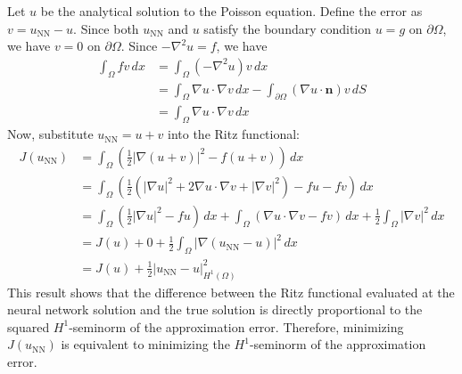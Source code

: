 \documentclass{article}
\begin{document}
Let $u$ be the analytical solution to the Poisson equation. Define the error as $v = u_{\text{NN}} - u$. Since both $u_{\text{NN}}$ and $u$ satisfy the boundary condition $u=g$ on $\partial\Omega$, we have $v=0$ on $\partial\Omega$.
Since $-\nabla^2 u = f$, we have
\begin{align*}
\int_{\Omega} f v \, dx &= \int_{\Omega} (-\nabla^2 u) v \, dx \\
&= \int_{\Omega} \nabla u \cdot \nabla v \, dx - \int_{\partial\Omega} (\nabla u \cdot \mathbf{n}) v \, dS \\
&= \int_{\Omega} \nabla u \cdot \nabla v \, dx
\end{align*}
Now, substitute $u_{\text{NN}} = u + v$ into the Ritz functional:
\begin{align*}
J(u_{\text{NN}}) &= \int_{\Omega} \left( \frac{1}{2} |\nabla (u + v)|^2 - f (u + v) \right) \, dx \\
&= \int_{\Omega} \left( \frac{1}{2} (|\nabla u|^2 + 2 \nabla u \cdot \nabla v + |\nabla v|^2) - f u - f v \right) \, dx \\
&= \int_{\Omega} \left( \frac{1}{2} |\nabla u|^2 - f u \right) \, dx + \int_{\Omega} \left( \nabla u \cdot \nabla v - f v \right) \, dx + \frac{1}{2} \int_{\Omega} |\nabla v|^2 \, dx \\
&= J(u) + 0 + \frac{1}{2} \int_{\Omega} |\nabla (u_{\text{NN}} - u)|^2 \, dx \\
&= J(u) + \frac{1}{2} \vert u_{\text{NN}} - u\vert_{H^1(\Omega)}^2
\end{align*}
This result shows that the difference between the Ritz functional evaluated at the neural network solution and the true solution is directly proportional to the squared $H^1$-seminorm of the approximation error. Therefore, minimizing $J(u_{\text{NN}})$ is equivalent to minimizing the $H^1$-seminorm of the approximation error.
\end{document}
